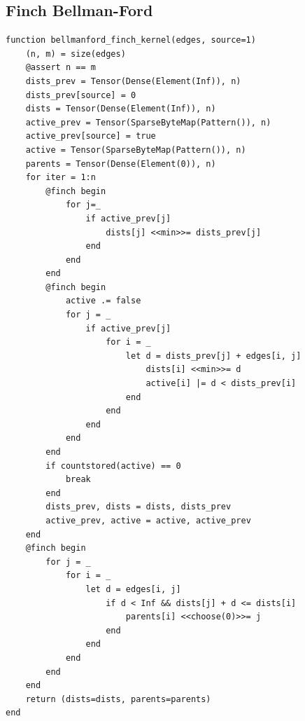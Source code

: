 \subsection{Finch Bellman-Ford}
\begin{verbatim}
function bellmanford_finch_kernel(edges, source=1)
    (n, m) = size(edges)
    @assert n == m
    dists_prev = Tensor(Dense(Element(Inf)), n)
    dists_prev[source] = 0 
    dists = Tensor(Dense(Element(Inf)), n)
    active_prev = Tensor(SparseByteMap(Pattern()), n)
    active_prev[source] = true
    active = Tensor(SparseByteMap(Pattern()), n)
    parents = Tensor(Dense(Element(0)), n)
    for iter = 1:n  
        @finch begin
            for j=_ 
                if active_prev[j]
                    dists[j] <<min>>= dists_prev[j]
                end 
            end 
        end 
        @finch begin
            active .= false
            for j = _ 
                if active_prev[j]
                    for i = _ 
                        let d = dists_prev[j] + edges[i, j]
                            dists[i] <<min>>= d
                            active[i] |= d < dists_prev[i]
                        end 
                    end 
                end 
            end 
        end 
        if countstored(active) == 0
            break
        end 
        dists_prev, dists = dists, dists_prev
        active_prev, active = active, active_prev
    end 
    @finch begin
        for j = _ 
            for i = _ 
                let d = edges[i, j]
                    if d < Inf && dists[j] + d <= dists[i]
                        parents[i] <<choose(0)>>= j
                    end 
                end 
            end 
        end 
    end 
    return (dists=dists, parents=parents)
end
\end{verbatim}


